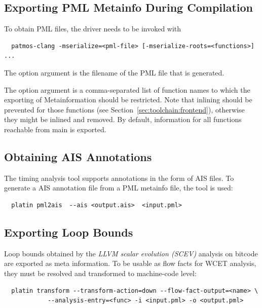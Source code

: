 \subsection{Exporting PML Metainfo During Compilation}

To obtain PML files, the  driver needs to be invoked with

\begin{verbatim}
  patmos-clang -mserialize=<pml-file> [-mserialize-roots=<functions>] ...
\end{verbatim}

The option argument  is the filename of the PML file that is
generated.

The option argument  is a comma-separated list of function
names to which the exporting of Metainformation should be restricted.
Note that inlining should be prevented for those functions (see
Section~\ref{sec:toolchain:frontend}), otherwise they might be inlined and removed.
By default, information for all functions reachable from main is exported.


\subsection{Obtaining AIS Annotations}

The  timing analysis tool supports annotations in the form of
AIS files.
To generate a AIS annotation file from a PML metainfo file, the
 tool is used:

\begin{verbatim}
  platin pml2ais  --ais <output.ais>  <input.pml>
\end{verbatim}


\subsection{Exporting Loop Bounds}

Loop bounds obtained by the \emph{LLVM scalar evolution (SCEV)} analysis
on bitcode are exported as meta information.
%
To be usable as flow facts for WCET analysis, they must be resolved and
transformed to machine-code level:

\begin{verbatim}
  platin transform --transform-action=down --flow-fact-output=<name> \
            --analysis-entry=<func> -i <input.pml> -o <output.pml>
\end{verbatim}

